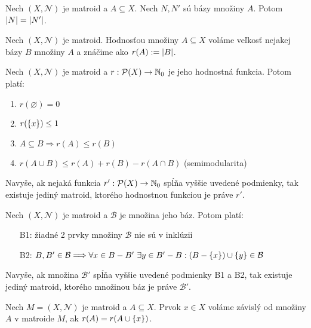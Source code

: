 \begin{theorem}
Nech $(X, \mathcal{N})$ je matroid a $A \subseteq X$. Nech $N, N'$ sú bázy množiny $A$. Potom $\left|N\right| = \left|N'\right|$.
\end{theorem}

\begin{definition}
Nech $(X, \mathcal{N})$ je matroid. Hodnosťou množiny $A \subseteq X$ voláme veľkosť nejakej bázy $B$ množiny $A$ a znáčime ako $r(A) := \left|B\right|$.
\end{definition}

\begin{theorem}
Nech $(X, \mathcal{N})$ je matroid a $r:\mathcal{P}(X) \to \mathbb{N}_0$ je jeho hodnostná funkcia. Potom platí:
\begin{enumerate}
    \item $r(\varnothing) = 0$
    \item $r(\left\{x\right\}) \leq 1$
    \item $A \subseteq B \Longrightarrow r(A) \leq r(B)$
    \item $r(A \cup B) \leq r(A) + r(B) - r(A \cap B)$ (semimodularita)
\end{enumerate}

Navyše, ak nejaká funkcia $r':\mathcal{P}(X)\to\mathbb{N}_0$ spĺňa vyššie uvedené podmienky, tak existuje jediný matroid, ktorého
hodnostnou funkciou je práve $r'$.

\end{theorem}

\begin{theorem}
Nech $(X, \mathcal{N})$ je matroid a $\mathcal{B}$ je množina jeho báz. Potom platí:
\begin{enumerate}
    \item[B1:] žiadné 2 prvky množiny $\mathcal{B}$ nie sú v inklúzii
    \item[B2:] $B, B' \in \mathcal{B} \Longrightarrow \forall x \in B - B' ~\exists y \in B' - B: (B-\left\{x\right\}) \cup \left\{y\right\} \in \mathcal{B}$
\end{enumerate}

Navyše, ak množina $\mathcal{B}'$ spĺňa vyššie uvedené podmienky B1 a B2, tak existuje jediný matroid, ktorého množinou báz je práve $\mathcal{B}'$.
\end{theorem}

\begin{definition}
Nech $M = (X, \mathcal{N})$ je matroid a $A \subseteq X$. Prvok $x \in X$ voláme závislý od množiny $A$ v matroide $M$, ak $r(A) = r(A \cup \left\{x\right\})$.
\end{definition}

